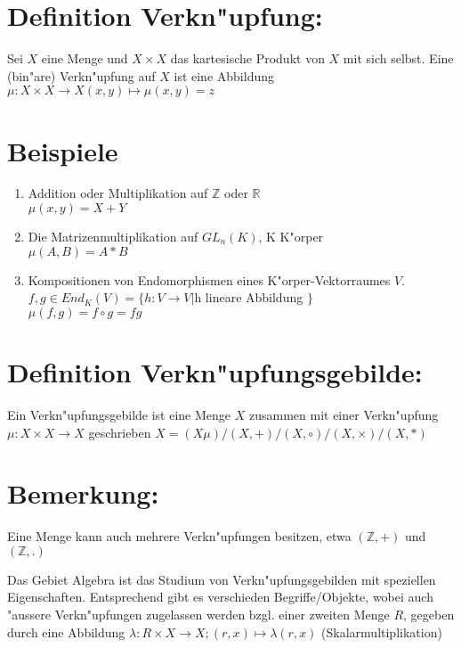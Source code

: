 \documentclass[12pt,a4paper,ngerman]{scrreprt}
\begin{document}
\section{Definition Verkn"upfung:}

Sei $X$ eine Menge und $X \times X$ das kartesische Produkt von $X$ mit sich selbst.
Eine (bin"are) Verkn"upfung auf $X$ ist eine Abbildung 
$\mu: X \times X \to X (x,y) \mapsto \mu(x,y) = z$

\section{Beispiele}

\begin{enumerate}[(1)]
\item Addition oder Multiplikation auf $\mathbb{Z}$ oder $\mathbb{R}$ \\ $\mu(x,y) = X+Y$\\
\item Die Matrizenmultiplikation auf $GL_n(K)$, K K"orper \\ $\mu(A,B) = A*B$\\
\item Kompositionen von Endomorphismen eines K"orper-Vektorraumes $V$.\\
$f,g \in End_K(V) = \{ h:V\to V | $h lineare Abbildung $\}$\\
$\mu (f,g) = f \circ g = fg$\\
\end{enumerate}

\section{Definition Verkn"upfungsgebilde:}

Ein Verkn"upfungsgebilde ist eine Menge $X$ zusammen mit einer Verkn"upfung
$\mu: X \times X \to X $ geschrieben $X = (X\mu)/(X,+)/(X,\circ)/(X,\times)/(X,*)$

\section{Bemerkung:}

Eine Menge kann auch mehrere Verkn"upfungen besitzen, etwa $(\mathbb{Z},+)$ und $(\mathbb{Z},.)$

Das Gebiet Algebra ist das Studium von Verkn"upfungsgebilden mit speziellen Eigenschaften. Entsprechend gibt es verschieden Begriffe/Objekte, wobei auch "aussere Verkn"upfungen zugelassen werden
bzgl. einer zweiten Menge $R$, gegeben durch eine Abbildung $\lambda: R \times X \to X; (r,x) \mapsto \lambda(r,x)$ (Skalarmultiplikation)
\end{document}
